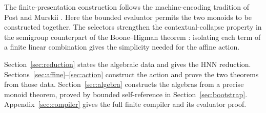 The finite-presentation construction follows the machine-encoding
tradition of Post and Murskii \cite{Post1947,Murskii1967}.
Here the bounded evaluator permits the two monoids to be constructed
together. The selectors strengthen the contextual-collapse property in
the semigroup counterpart of the Boone--Higman theorem
\cite[pp.~49--52]{BH74}: isolating each term of a finite linear
combination gives the simplicity needed for the affine action.

Section~\ref{sec:reduction} states the algebraic data and gives the
HNN reduction.
Sections~\ref{sec:affine}--\ref{sec:action} construct the action and prove
the two theorems from those data.
Section~\ref{sec:algebra} constructs the algebras from a precise monoid
theorem, proved by bounded self-reference in Section~\ref{sec:bootstrap}.
Appendix~\ref{sec:compiler} gives the full finite compiler and its
evaluator proof.
